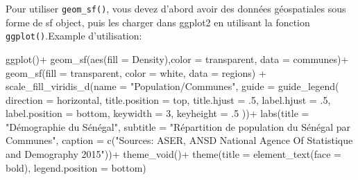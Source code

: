 \documentclass[
]{article}
\newenvironment{Shaded}{\begin{snugshade}}{\end{snugshade}}
\newcommand{\AttributeTok}[1]{\textcolor[rgb]{0.77,0.63,0.00}{#1}}
\newcommand{\DecValTok}[1]{\textcolor[rgb]{0.00,0.00,0.81}{#1}}
\newcommand{\FunctionTok}[1]{\textcolor[rgb]{0.00,0.00,0.00}{#1}}
\newcommand{\NormalTok}[1]{#1}
\newcommand{\SpecialCharTok}[1]{\textcolor[rgb]{0.00,0.00,0.00}{#1}}
\newcommand{\StringTok}[1]{\textcolor[rgb]{0.31,0.60,0.02}{#1}}
\begin{document}
Pour utiliser \texttt{geom\_sf()}, vous devez d'abord avoir des données
géospatiales sous forme de sf object, puis les charger dans ggplot2 en
utilisant la fonction \texttt{ggplot()}.Example d'utilisation:

\begin{Shaded}
\begin{Highlighting}[]
\FunctionTok{ggplot}\NormalTok{()}\SpecialCharTok{+}
  \FunctionTok{geom\_sf}\NormalTok{(}\FunctionTok{aes}\NormalTok{(}\AttributeTok{fill =}\NormalTok{ Density),}\AttributeTok{color =} \StringTok{\textquotesingle{}transparent\textquotesingle{}}\NormalTok{, }\AttributeTok{data =}\NormalTok{ communes)}\SpecialCharTok{+}
  \FunctionTok{geom\_sf}\NormalTok{(}\AttributeTok{fill =} \StringTok{\textquotesingle{}transparent\textquotesingle{}}\NormalTok{, }\AttributeTok{color =} \StringTok{\textquotesingle{}white\textquotesingle{}}\NormalTok{, }\AttributeTok{data =}\NormalTok{ regions) }\SpecialCharTok{+}
  \FunctionTok{scale\_fill\_viridis\_d}\NormalTok{(}\AttributeTok{name =} \StringTok{"Population/Communes"}\NormalTok{,}
                       \AttributeTok{guide =} \FunctionTok{guide\_legend}\NormalTok{(}
                         \AttributeTok{direction =} \StringTok{\textquotesingle{}horizontal\textquotesingle{}}\NormalTok{,}
                         \AttributeTok{title.position =} \StringTok{\textquotesingle{}top\textquotesingle{}}\NormalTok{,}
                         \AttributeTok{title.hjust =}\NormalTok{ .}\DecValTok{5}\NormalTok{,}
                         \AttributeTok{label.hjust =}\NormalTok{ .}\DecValTok{5}\NormalTok{,}
                         \AttributeTok{label.position =} \StringTok{\textquotesingle{}bottom\textquotesingle{}}\NormalTok{,}
                         \AttributeTok{keywidth =} \DecValTok{3}\NormalTok{,}
                         \AttributeTok{keyheight =}\NormalTok{ .}\DecValTok{5}
\NormalTok{                       ))}\SpecialCharTok{+}
  \FunctionTok{labs}\NormalTok{(}\AttributeTok{title =} \StringTok{"Démographie du Sénégal"}\NormalTok{,}
       \AttributeTok{subtitle =} \StringTok{"Répartition de population du Sénégal par Communes"}\NormalTok{,}
       \AttributeTok{caption =} \FunctionTok{c}\NormalTok{(}\StringTok{"Sources: ASER, ANSD National Agence Of Statistique and Demography 2015"}\NormalTok{))}\SpecialCharTok{+}
  \FunctionTok{theme\_void}\NormalTok{()}\SpecialCharTok{+}
  \FunctionTok{theme}\NormalTok{(}\AttributeTok{title =} \FunctionTok{element\_text}\NormalTok{(}\AttributeTok{face =} \StringTok{\textquotesingle{}bold\textquotesingle{}}\NormalTok{),}
        \AttributeTok{legend.position =} \StringTok{\textquotesingle{}bottom\textquotesingle{}}\NormalTok{)}
\end{Highlighting}
\end{Shaded}
\end{document}
